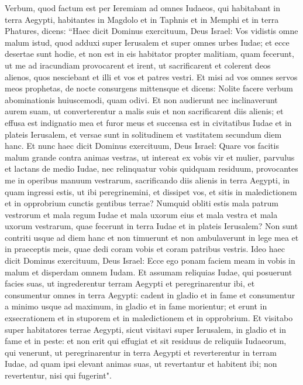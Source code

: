 \begin{biblechapter}  
\verse Verbum, quod factum est per Ieremiam ad omnes Iudaeos, qui habitabant in terra Aegypti, habitantes in Magdolo et in Taphnis et in Memphi et in terra Phatures, dicens: 
\verse “Haec dicit Dominus exercituum, Deus Israel: Vos vidistis omne malum istud, quod adduxi super Ierusalem et super omnes urbes Iudae; et ecce desertae sunt hodie, et non est in eis habitator 
\verse propter malitiam, quam fecerunt, ut me ad iracundiam provocarent et irent, ut sacrificarent et colerent deos alienos, quos nesciebant et illi et vos et patres vestri. 
\verse Et misi ad vos omnes servos meos prophetas, de nocte consurgens mittensque et dicens: Nolite facere verbum abominationis huiuscemodi, quam odivi. 
\verse Et non audierunt nec inclinaverunt aurem suam, ut converterentur a malis suis et non sacrificarent diis alienis; 
\verse et effusa est indignatio mea et furor meus et succensa est in civitatibus Iudae et in plateis Ierusalem, et versae sunt in solitudinem et vastitatem secundum diem hanc. 
\verse Et nunc haec dicit Dominus exercituum, Deus Israel: Quare vos facitis malum grande contra animas vestras, ut intereat ex vobis vir et mulier, parvulus et lactans de medio Iudae, nec relinquatur vobis quidquam residuum, 
\verse provocantes me in operibus manuum vestrarum, sacrificando diis alienis in terra Aegypti, in quam ingressi estis, ut ibi peregrinemini, et dissipet vos, et sitis in maledictionem et in opprobrium cunctis gentibus terrae? 
\verse Numquid obliti estis mala patrum vestrorum et mala regum Iudae et mala uxorum eius et mala vestra et mala uxorum vestrarum, quae fecerunt in terra Iudae et in plateis Ierusalem? 
\verse Non sunt contriti usque ad diem hanc et non timuerunt et non ambulaverunt in lege mea et in praeceptis meis, quae dedi coram vobis et coram patribus vestris. 
\verse Ideo haec dicit Dominus exercituum, Deus Israel: Ecce ego ponam faciem meam in vobis in malum et disperdam omnem Iudam. 
\verse Et assumam reliquias Iudae, qui posuerunt facies suas, ut ingrederentur terram Aegypti et peregrinarentur ibi, et consumentur omnes in terra Aegypti: cadent in gladio et in fame et consumentur a minimo usque ad maximum, in gladio et in fame morientur; et erunt in exsecrationem et in stuporem et in maledictionem et in opprobrium. 
\verse Et visitabo super habitatores terrae Aegypti, sicut visitavi super Ierusalem, in gladio et in fame et in peste: 
\verse et non erit qui effugiat et sit residuus de reliquiis Iudaeorum, qui venerunt, ut peregrinarentur in terra Aegypti et reverterentur in terram Iudae, ad quam ipsi elevant animas suas, ut revertantur et habitent ibi; non revertentur, nisi qui fugerint". 

\end{biblechapter}
